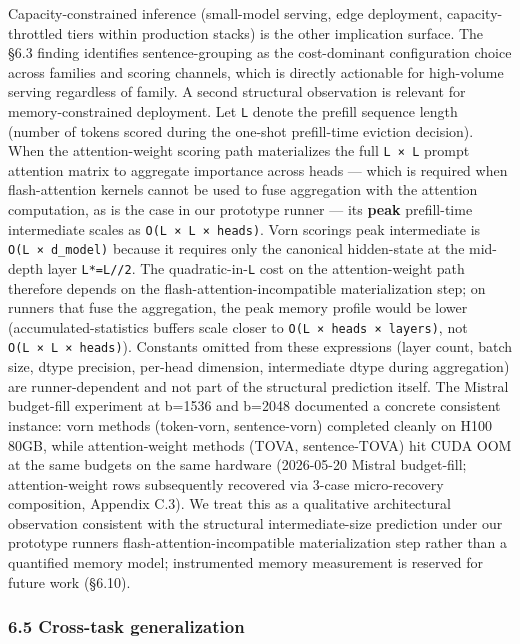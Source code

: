 \documentclass[
]{article}
\begin{document}
Capacity-constrained inference (small-model serving, edge deployment,
capacity-throttled tiers within production stacks) is the other
implication surface. The §6.3 finding identifies sentence-grouping as
the cost-dominant configuration choice across families and scoring
channels, which is directly actionable for high-volume serving
regardless of family. A second structural observation is relevant for
memory-constrained deployment. Let \texttt{L} denote the prefill
sequence length (number of tokens scored during the one-shot
prefill-time eviction decision). When the attention-weight scoring path
materializes the full \texttt{L\ ×\ L} prompt attention matrix to
aggregate importance across heads --- which is required when
flash-attention kernels cannot be used to fuse aggregation with the
attention computation, as is the case in our prototype runner --- its
\textbf{peak} prefill-time intermediate scales as
\texttt{O(L\ ×\ L\ ×\ heads)}. Vorn scoring\textquotesingle s peak intermediate is
\texttt{O(L\ ×\ d\_model)} because it requires only the canonical
hidden-state at the mid-depth layer \texttt{L*=L//2}. The
quadratic-in-\texttt{L} cost on the attention-weight path therefore
depends on the flash-attention-incompatible materialization step; on
runners that fuse the aggregation, the peak memory profile would be
lower (accumulated-statistics buffers scale closer to
\texttt{O(L\ ×\ heads\ ×\ layers)}, not \texttt{O(L\ ×\ L\ ×\ heads)}).
Constants omitted from these expressions (layer count, batch size, dtype
precision, per-head dimension, intermediate dtype during aggregation)
are runner-dependent and not part of the structural prediction itself.
The Mistral budget-fill experiment at b=1536 and b=2048
documented a concrete consistent instance: vorn methods
(token-vorn, sentence-vorn) completed cleanly on H100 80GB, while
attention-weight methods (TOVA, sentence-TOVA) hit CUDA OOM
at the same budgets on the same hardware (2026-05-20 Mistral
budget-fill; attention-weight rows subsequently recovered via 3-case
micro-recovery composition, Appendix C.3). We
treat this as a qualitative architectural observation consistent with
the structural intermediate-size prediction under our prototype
runner\textquotesingle s flash-attention-incompatible materialization
step rather than a quantified memory model; instrumented memory
measurement is reserved for future work (§6.10).

\subsubsection{6.5 Cross-task
generalization}\label{65-cross-task-generalization}
\end{document}
